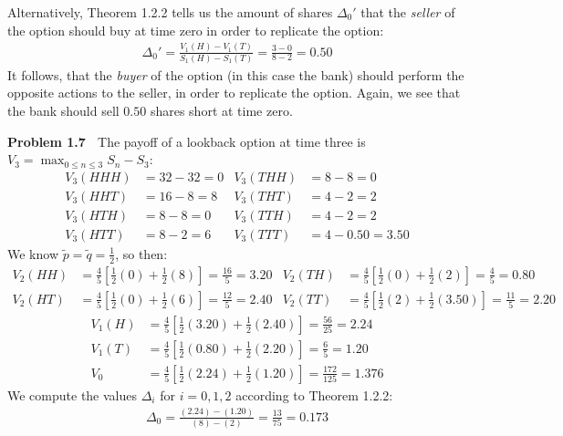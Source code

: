 \documentclass[12pt, letterpaper]{article}
\begin{document}
\vspace{5mm}
Alternatively, Theorem 1.2.2 tells us the amount of shares $\Delta_0'$ that the \textit{seller} of the option should buy at time zero in order to replicate the option:
\begin{gather*}
    \Delta_0 ' = \frac{V_1(H)-V_1(T)}{S_1(H)- S_1(T)} = \frac{3-0}{8-2} = 0.50
\end{gather*}
It follows, that the \textit{buyer} of the option (in this case the bank) should perform the opposite actions to the seller, in order to replicate the option.
Again, we see that the bank should sell $0.50$ shares short at time zero.

\rightline{$\square$}

\vspace{5mm}
\noindent
\textbf{Problem 1.7} $\;$ The payoff of a lookback option at time three is $V_3 = \max_{0 \leq n \leq 3} S_n - S_3$:
\begin{align*}
    V_3(HHH) &= 32 - 32 = 0 & V_3(THH) &= 8 - 8 = 0 \\
    V_3(HHT) &= 16 - 8 = 8 & V_3(THT) &= 4 - 2 = 2 \\
    V_3(HTH) &= 8 - 8 = 0 & V_3(TTH) &= 4 - 2 = 2 \\
    V_3(HTT) &= 8 - 2 = 6 & V_3(TTT) &= 4 - 0.50 = 3.50
\end{align*}
We know $\tilde p = \tilde q = \tfrac{1}{2}$, so then:
\begin{align*}
    V_2(HH) &= \tfrac{4}{5}\left[ \tfrac{1}{2}(0) + \tfrac{1}{2}(8) \right] = \tfrac{16}{5} = 3.20 & V_2(TH) &= \tfrac{4}{5}\left[ \tfrac{1}{2}(0) + \tfrac{1}{2}(2) \right] = \tfrac{4}{5} = 0.80 \\
    V_2(HT) &= \tfrac{4}{5}\left[ \tfrac{1}{2}(0) + \tfrac{1}{2}(6) \right] = \tfrac{12}{5} = 2.40  & V_2(TT) &= \tfrac{4}{5}\left[ \tfrac{1}{2}(2) + \tfrac{1}{2}(3.50) \right] = \tfrac{11}{5} = 2.20
\end{align*}
\begin{align*}
    V_1(H) &= \tfrac{4}{5}\left[ \tfrac{1}{2}(3.20) + \tfrac{1}{2}(2.40) \right] = \tfrac{56}{25} = 2.24 \\
    V_1(T) &= \tfrac{4}{5} \left[ \tfrac{1}{2}(0.80) + \tfrac{1}{2}(2.20) \right] = \tfrac{6}{5} = 1.20 \\
    V_0 &= \tfrac{4}{5} \left[ \tfrac{1}{2}(2.24) + \tfrac{1}{2}(1.20) \right] = \tfrac{172}{125} = 1.376
\end{align*}
We compute the values $\Delta_i$ for $i = 0, 1, 2$ according to Theorem 1.2.2:
\begin{align*}
    \Delta_0 = \frac{(2.24) - (1.20)}{(8) - (2)} = \frac{13}{75} = 0.173 
\end{align*}
\end{document}
